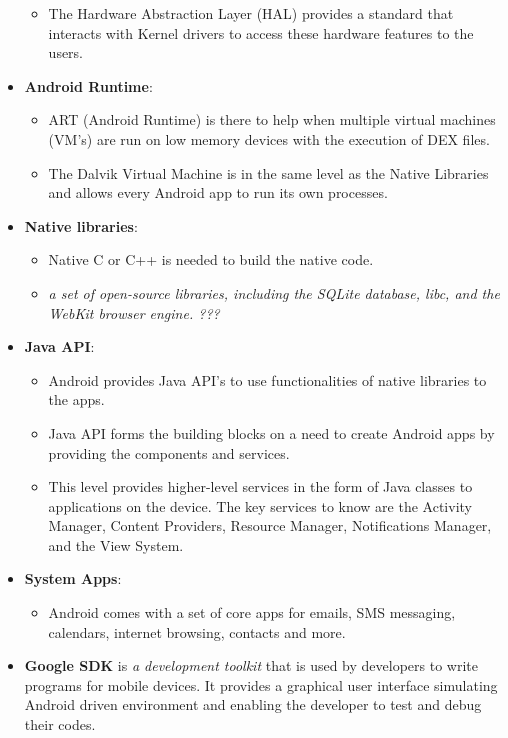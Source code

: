 \documentclass[9pt, b5paper]{article}
\begin{document}
\begin{itemize}
\begin{itemize}
\item The Hardware Abstraction Layer (HAL) provides a standard that interacts with Kernel drivers to access these hardware features to the users.
\end{itemize}
\item \textbf{Android Runtime}:
\begin{itemize}
\item ART (Android Runtime) is there to help when multiple virtual machines (VM's) are run on low memory devices with the execution of DEX files.
\item The Dalvik Virtual Machine is in the same level as the Native Libraries and allows every Android app to run its own processes.
\end{itemize}
\item \textbf{Native libraries}:
\begin{itemize}
\item Native C or C++ is needed to build the native code.
\item \emph{a set of open-source libraries, including the SQLite database, libc, and the WebKit browser engine. ???}
\end{itemize}
\item \textbf{Java API}:
\begin{itemize}
\item Android provides Java API's to use functionalities of native libraries to the apps.
\item Java API forms the building blocks on a need to create Android apps by providing the components and services.
\item This level provides higher-level services in the form of Java classes to applications on the device. The key services to know are the Activity Manager, Content Providers, Resource Manager, Notifications Manager, and the View System.
\end{itemize}
\item \textbf{System Apps}:
\begin{itemize}
\item Android comes with a set of core apps for emails, SMS messaging, calendars, internet browsing, contacts and more.
\end{itemize}
\item \textbf{Google SDK} is \emph{a development toolkit} that is used by developers to write programs for mobile devices. It provides a graphical user interface simulating Android driven environment and enabling the developer to test and debug their codes.
\end{itemize}
\end{document}

